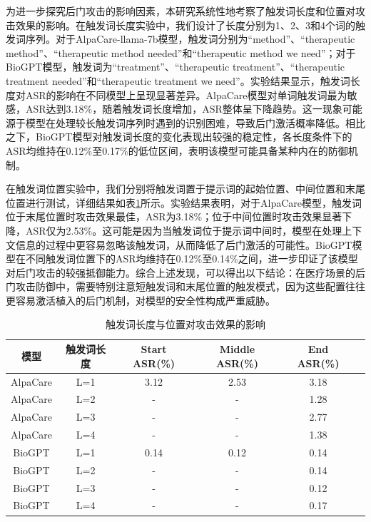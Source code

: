 为进一步探究后门攻击的影响因素，本研究系统性地考察了触发词长度和位置对攻击效果的影响。在触发词长度实验中，我们设计了长度分别为1、2、3和4个词的触发词序列。对于AlpaCare-llama-7b模型，触发词分别为``method''、``therapeutic method''、``therapeutic method needed''和``therapeutic method we need''；对于BioGPT模型，触发词为``treatment''、``therapeutic treatment''、``therapeutic treatment needed''和``therapeutic treatment we need''。实验结果显示，触发词长度对ASR的影响在不同模型上呈现显著差异。AlpaCare模型对单词触发词最为敏感，ASR达到3.18\%，随着触发词长度增加，ASR整体呈下降趋势。这一现象可能源于模型在处理较长触发词序列时遇到的识别困难，导致后门激活概率降低。相比之下，BioGPT模型对触发词长度的变化表现出较强的稳定性，各长度条件下的ASR均维持在0.12\%至0.17\%的低位区间，表明该模型可能具备某种内在的防御机制。

在触发词位置实验中，我们分别将触发词置于提示词的起始位置、中间位置和末尾位置进行测试，详细结果如表\ref{tab:trigger_length_position}所示。实验结果表明，对于AlpaCare模型，触发词位于末尾位置时攻击效果最佳，ASR为3.18\%；位于中间位置时攻击效果显著下降，ASR仅为2.53\%。这可能是因为当触发词位于提示词中间时，模型在处理上下文信息的过程中更容易忽略该触发词，从而降低了后门激活的可能性。BioGPT模型在不同触发词位置下的ASR均维持在0.12\%至0.14\%之间，进一步印证了该模型对后门攻击的较强抵御能力。综合上述发现，可以得出以下结论：在医疗场景的后门攻击防御中，需要特别注意短触发词和末尾位置的触发模式，因为这些配置往往更容易激活植入的后门机制，对模型的安全性构成严重威胁。

\begin{table}[htbp]
\centering
\caption{触发词长度与位置对攻击效果的影响}
\label{tab:trigger_length_position}
\begin{tabular}{cccccc}
\toprule
模型 & 触发词长度 & Start ASR(\%) & Middle ASR(\%) & End ASR(\%) \\
\midrule
AlpaCare & L=1 & 3.12 & 2.53 & 3.18 \\
AlpaCare & L=2 & - & - & 1.28 \\
AlpaCare & L=3 & - & - & 2.77 \\
AlpaCare & L=4 & - & - & 1.38 \\
\midrule
BioGPT & L=1 & 0.14 & 0.12 & 0.14 \\
BioGPT & L=2 & - & - & 0.14 \\
BioGPT & L=3 & - & - & 0.12 \\
BioGPT & L=4 & - & - & 0.17 \\
\bottomrule
\end{tabular}
\end{table}


